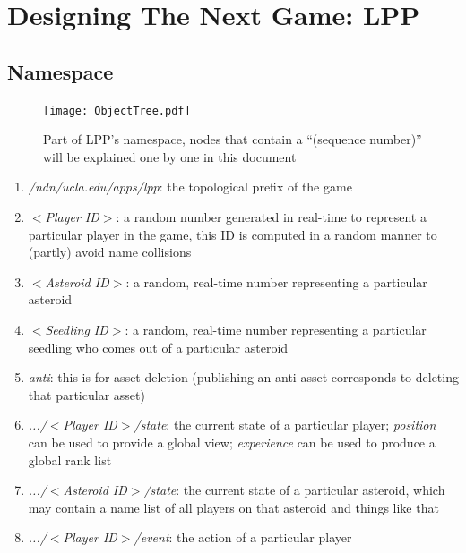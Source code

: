 \documentclass{article}
\begin{document}
\section{Designing The Next Game: LPP}
\label{sec:dslpp}

\subsection{Namespace}

\begin{figure}
\begin{center}
\texttt{[image: ObjectTree.pdf]}
\caption{Part of LPP's namespace, nodes that contain a ``(sequence number)'' will be explained one by one in this document}
\label{ns}
\end{center}
\end{figure}

\begin{enumerate}
\item \emph{/ndn/ucla.edu/apps/lpp}: the topological prefix of the game
\item \emph{$<$Player ID$>$}: a random number generated in real-time to represent a particular player in the game, this ID is computed in a random manner to (partly) avoid name collisions
\item \emph{$<$Asteroid ID$>$}: a random, real-time number representing a particular asteroid
\item \emph{$<$Seedling ID$>$}: a random, real-time number representing a particular seedling who comes out of a particular asteroid
\item \emph{anti}: this is for asset deletion (publishing an anti-asset corresponds to deleting that particular asset)
\item \emph{.../$<$Player ID$>$/state}: the current state of a particular player; \emph{position} can be used to provide a global view; \emph{experience} can be used to produce a global rank list
\item \emph{.../$<$Asteroid ID$>$/state}: the current state of a particular asteroid, which may contain a name list of all players on that asteroid and things like that
\item \emph{.../$<$Player ID$>$/event}: the action of a particular player
\end{enumerate}
\end{document}

